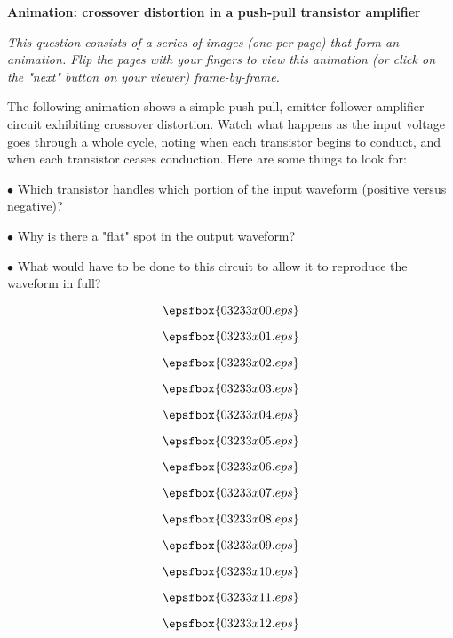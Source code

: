

\centerline{\bf Animation: crossover distortion in a push-pull transistor amplifier}

\vskip 10pt

{\it This question consists of a series of images (one per page) that form an animation.  Flip the pages with your fingers to view this animation (or click on the "next" button on your viewer) frame-by-frame.}

\vskip 10pt

The following animation shows a simple push-pull, emitter-follower amplifier circuit exhibiting crossover distortion.  Watch what happens as the input voltage goes through a whole cycle, noting when each transistor begins to conduct, and when each transistor ceases conduction.  Here are some things to look for:

\medskip
\goodbreak
\item{$\bullet$} Which transistor handles which portion of the input waveform (positive versus negative)?
\item{$\bullet$} Why is there a "flat" spot in the output waveform?
\item{$\bullet$} What would have to be done to this circuit to allow it to reproduce the waveform in full?
\medskip

\vfil \eject
$$\epsfbox{03233x00.eps}$$

\vfil \eject
$$\epsfbox{03233x01.eps}$$

\vfil \eject
$$\epsfbox{03233x02.eps}$$

\vfil \eject
$$\epsfbox{03233x03.eps}$$

\vfil \eject
$$\epsfbox{03233x04.eps}$$

\vfil \eject
$$\epsfbox{03233x05.eps}$$

\vfil \eject
$$\epsfbox{03233x06.eps}$$

\vfil \eject
$$\epsfbox{03233x07.eps}$$

\vfil \eject
$$\epsfbox{03233x08.eps}$$

\vfil \eject
$$\epsfbox{03233x09.eps}$$

\vfil \eject
$$\epsfbox{03233x10.eps}$$

\vfil \eject
$$\epsfbox{03233x11.eps}$$

\vfil \eject
$$\epsfbox{03233x12.eps}$$

